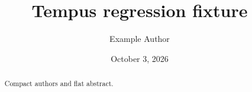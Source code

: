 \documentclass{tempusreport}
\title{Tempus regression fixture}
\author{Example Author}\date{October 3, 2026}
\begin{document}
\maketitle
\begin{abstract}Compact authors and flat abstract.\end{abstract}
\end{document}
